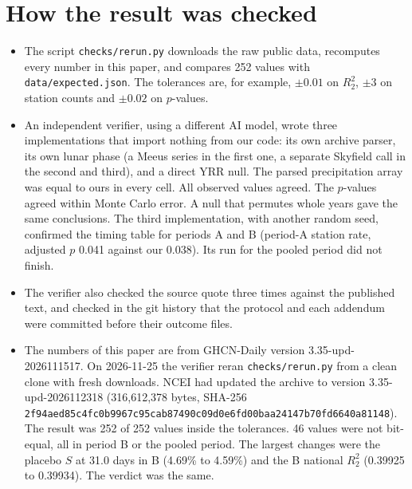 \documentclass[11pt]{article}
\newcommand{\Rtwo}{R^2_2}
\begin{document}
\section{How the result was checked}
\begin{itemize}
\item The script \texttt{checks/rerun.py} downloads the raw public data, recomputes every number in this paper, and compares 252 values with \texttt{data/expected.json}. The tolerances are, for example, $\pm0.01$ on $\Rtwo$, $\pm3$ on station counts and $\pm0.02$ on $p$-values.
\item An independent verifier, using a different AI model, wrote three implementations that import nothing from our code: its own archive parser, its own lunar phase (a Meeus series in the first one, a separate Skyfield call in the second and third), and a direct YRR null. The parsed precipitation array was equal to ours in every cell. All observed values agreed. The $p$-values agreed within Monte Carlo error. A null that permutes whole years gave the same conclusions. The third implementation, with another random seed, confirmed the timing table for periods A and B (period-A station rate, adjusted $p$ 0.041 against our 0.038). Its run for the pooled period did not finish.
\item The verifier also checked the source quote three times against the published text, and checked in the git history that the protocol and each addendum were committed before their outcome files.
\item The numbers of this paper are from GHCN-Daily version 3.35-upd-2026111517. On 2026-11-25 the verifier reran \texttt{checks/rerun.py} from a clean clone with fresh downloads. NCEI had updated the archive to version 3.35-upd-2026112318 (316,612,378 bytes, SHA-256 \texttt{2f94aed8}\allowbreak\texttt{5c4fc0b9}\allowbreak\texttt{967c95ca}\allowbreak\texttt{b87490c0}\allowbreak\texttt{9d0e6fd0}\allowbreak\texttt{0baa2414}\allowbreak\texttt{7b70fd66}\allowbreak\texttt{40a81148}). The result was 252 of 252 values inside the tolerances. 46 values were not bit-equal, all in period B or the pooled period. The largest changes were the placebo $S$ at 31.0 days in B (4.69\% to 4.59\%) and the B national $\Rtwo$ (0.39925 to 0.39934). The verdict was the same.
\end{itemize}
\end{document}
